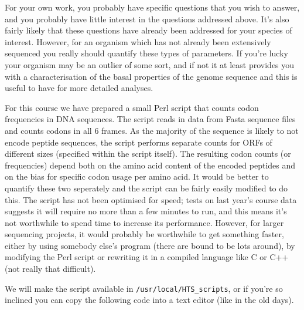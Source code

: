 \documentclass[11pt]{article}
\begin{document}
For your own work, you probably have specific questions that you wish to answer, and you
probably have little interest in the questions addressed above. It's also fairly likely that
these questions have already been addressed for your species of interest. However, for an
organism which has not already been extensively sequenced you really should quantify these types
of parameters. If you're lucky your organism may be an outlier of some sort, and if not it at
least provides you with a characterisation of the basal properties of the genome sequence and this
is useful to have for more detailed analyses.

For this course we have prepared a small Perl script that counts codon frequencies in DNA
sequences. The script reads in data from Fasta sequence files and counts codons in all 6 frames. 
As the majority of the sequence is likely to not encode peptide sequences,
the script performs separate counts for ORFs of different sizes (specified within the script
itself). The resulting codon counts (or frequencies) depend both on the amino acid content
of the encoded peptides and on the bias for specific codon usage per amino acid. 
It would be better to quantify these two seperately and the script can be fairly easily modified
to do this. The script has not been optimised for speed; tests on last year's course data suggests
it will require no more than a few minutes to run, and this means it's not worthwhile to spend
time to increase its performance. However, for larger sequencing projects, it would probably be
worthwhile to get something faster, either by using somebody else's program (there are bound
to be lots around), by modifying the Perl script or rewriting it in a compiled language like C
or C++ (not really that difficult).

We will make the script available in \texttt{/usr/local/HTS\_scripts}, or if you're so inclined
you can copy the following code into a text editor (like in the old days).
\end{document}
